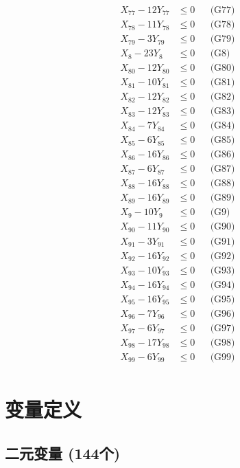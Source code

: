 \documentclass[a4paper,10pt]{article}
\begin{document}
{\begin{align}
X_{77} - 12Y_{77} &\leq 0 && \text{(G77)} \\
\allowbreak
X_{78} - 11Y_{78} &\leq 0 && \text{(G78)} \\
X_{79} - 3Y_{79} &\leq 0 && \text{(G79)} \\
X_{8} - 23Y_{8} &\leq 0 && \text{(G8)} \\
X_{80} - 12Y_{80} &\leq 0 && \text{(G80)} \\
X_{81} - 10Y_{81} &\leq 0 && \text{(G81)} \\
X_{82} - 12Y_{82} &\leq 0 && \text{(G82)} \\
X_{83} - 12Y_{83} &\leq 0 && \text{(G83)} \\
X_{84} - 7Y_{84} &\leq 0 && \text{(G84)} \\
X_{85} - 6Y_{85} &\leq 0 && \text{(G85)} \\
X_{86} - 16Y_{86} &\leq 0 && \text{(G86)} \\
X_{87} - 6Y_{87} &\leq 0 && \text{(G87)} \\
X_{88} - 16Y_{88} &\leq 0 && \text{(G88)} \\
X_{89} - 16Y_{89} &\leq 0 && \text{(G89)} \\
X_{9} - 10Y_{9} &\leq 0 && \text{(G9)} \\
X_{90} - 11Y_{90} &\leq 0 && \text{(G90)} \\
X_{91} - 3Y_{91} &\leq 0 && \text{(G91)} \\
X_{92} - 16Y_{92} &\leq 0 && \text{(G92)} \\
X_{93} - 10Y_{93} &\leq 0 && \text{(G93)} \\
X_{94} - 16Y_{94} &\leq 0 && \text{(G94)} \\
X_{95} - 16Y_{95} &\leq 0 && \text{(G95)} \\
\allowbreak
X_{96} - 7Y_{96} &\leq 0 && \text{(G96)} \\
X_{97} - 6Y_{97} &\leq 0 && \text{(G97)} \\
X_{98} - 17Y_{98} &\leq 0 && \text{(G98)} \\
X_{99} - 6Y_{99} &\leq 0 && \text{(G99)} \\
\end{align}}

\section{变量定义}

\subsection{二元变量 (144个)}
\end{document}
